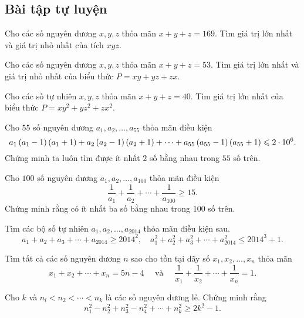 \subsection*{Bài tập tự luyện}
\begin{btt}
Cho các số nguyên dương $x,y,z$ thỏa mãn $x+y+z=169.$ Tìm giá trị lớn nhất và giá trị nhỏ nhất của tích $xyz.$
\end{btt}

\begin{btt}
Cho các số nguyên dương $x,y,z$ thỏa mãn $x+y+z=53.$ Tìm giá trị lớn nhất và giá trị nhỏ nhất của biểu thức $P=xy+yz+zx.$
\end{btt}

\begin{btt}
Cho các số tự nhiên $x,y,z$ thỏa mãn $x+y+z=40.$ Tìm giá trị lớn nhất của biểu thức $P=xy^2+yz^2+zx^2.$
\end{btt}

\begin{btt}
Cho $55$ số nguyên dương $a_1,a_2,\ldots,a_{55}$  thỏa mãn điều kiện 
$$a_1\left(\displaystyle a_1-1 \right)\left(\displaystyle a_1+1 \right)+a_2\left(\displaystyle a_2-1 \right)\left(\displaystyle a_2+1 \right)+\cdots+a_{55}\left(\displaystyle a_{55}-1 \right)\left(\displaystyle a_{55}+1 \right)\leqslant 2\cdot 10^6.$$
Chứng minh ta luôn tìm được ít nhất $2$ số bằng nhau trong $55$ số trên.
\end{btt}

\begin{btt}
Cho $100$ số nguyên dương $a_1,a_2,\ldots,a_{100}$ thỏa mãn điều kiện
$$\dfrac{1}{a_1}+\dfrac{1}{a_2}+\cdots+\dfrac{1}{a_{100}}\ge 15.$$
Chứng minh rằng có ít nhất ba số bằng nhau trong $100$ số trên.
\end{btt}

\begin{btt}
Tìm các bộ số tự nhiên $ {{a}_{1}},{{a}_{2}},\ldots,{{a}_{2014}}$ thỏa mãn điều kiện sau.
$${{a}_{1}}+{{a}_{2}}+{{a}_{3}}+\cdots+{{a}_{2014}}\ge {{2014}^{2}},\quad
  a_{1}^{2}+a_{2}^{2}+a_{3}^{2}+\cdots+a_{2014}^{2}\le {{2014}^{3}}+1.$$
\end{btt}

\begin{btt}
Tìm tất cả các số nguyên dương $n$ sao cho tồn tại dãy số $x_1,x_2,\ldots,x_n$ thỏa mãn 
\[{{x}_{1}}+{{x}_{2}}+\cdots +{{x}_{n}}=5n-4\quad \text{ và }\quad \dfrac{1}{{{x}_{1}}}+\dfrac{1}{{{x}_{2}}}+\cdots +\dfrac{1}{{{x}_{n}}}=1.\]
\end{btt}

\begin{btt}
Cho $k$ và $n_{l}<n_{2}<\cdots<n_{k}$ là các số nguyên dương lẻ. Chứng minh rằng
\[n_{1}^{2}-n_{2}^{2}+n_{3}^{2}-n_{4}^{2}+\cdots+n_{k}^{2} \geq 2 k^{2}-1.\]
\end{btt}

